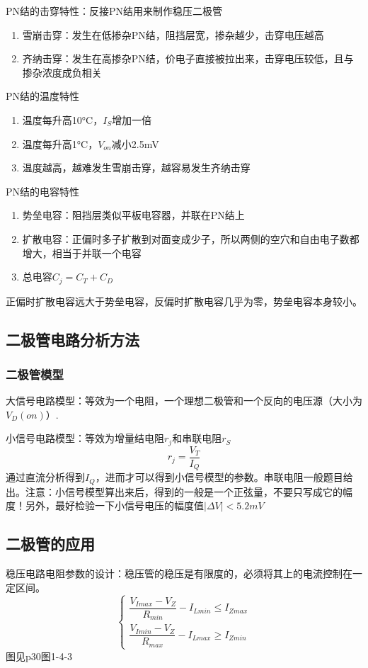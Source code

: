 \documentclass{ctexart}
\begin{document}
PN结的击穿特性：反接PN结用来制作稳压二极管
\begin{enumerate}
    \item 雪崩击穿：发生在低掺杂PN结，阻挡层宽，掺杂越少，击穿电压越高
    \item 齐纳击穿：发生在高掺杂PN结，价电子直接被拉出来，击穿电压较低，且与掺杂浓度成负相关
\end{enumerate}

PN结的温度特性
\begin{enumerate}
    \item 温度每升高10°C，$I_S$增加一倍
    \item 温度每升高1°C，$V_{on}$减小2.5mV
    \item 温度越高，越难发生雪崩击穿，越容易发生齐纳击穿
\end{enumerate}

PN结的电容特性
\begin{enumerate}
    \item 势垒电容：阻挡层类似平板电容器，并联在PN结上
    \item 扩散电容：正偏时多子扩散到对面变成少子，所以两侧的空穴和自由电子数都增大，相当于并联一个电容
    \item 总电容$C_j=C_T+C_D$
\end{enumerate}
正偏时扩散电容远大于势垒电容，反偏时扩散电容几乎为零，势垒电容本身较小。
\subsection{二极管电路分析方法}
\subsubsection{二极管模型}
大信号电路模型：等效为一个电阻，一个理想二极管和一个反向的电压源（大小为$V_D(on)$）.

小信号电路模型：等效为增量结电阻$r_j$和串联电阻$r_S$
\begin{equation}
    r_j=\dfrac{V_T}{I_Q}
\end{equation}
通过直流分析得到$I_Q$，进而才可以得到小信号模型的参数。串联电阻一般题目给出。{\color{Red}注意：小信号模型算出来后，得到的一般是一个正弦量，不要只写成它的幅度！另外，最好检验一下小信号电压的幅度值$|\Delta V|<5.2mV$}
\subsection{二极管的应用}
稳压电路电阻参数的设计：稳压管的稳压是有限度的，必须将其上的电流控制在一定区间。
\begin{equation}
    \begin{cases}
        \dfrac{V_{Imax}-V_Z}{R_{min}}-I_{Lmin}\leq I_{Zmax}\\
        \dfrac{V_{Imin}-V_Z}{R_{max}}-I_{Lmax}\geq I_{Zmin}
    \end{cases}
\end{equation}
图见p30图1-4-3
\end{document}

